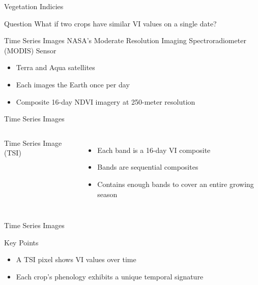 \documentclass[draft,compress]{beamer}
\begin{document}
\begin{frame}{Vegetation Indicies}
\begingroup
{}
\begin{block}{Question}
What if two crops have similar VI values on a single date?
\end{block}
\endgroup
{}
\end{frame}

\begin{frame}{Time Series Images}
NASA's Moderate Resolution Imaging Spectroradiometer (MODIS) Sensor
\begin{itemize}
  \item<1-> Terra and Aqua satellites
  \item<2-> Each images the Earth once per day
  \item<3-> Composite 16-day NDVI imagery at 250-meter resolution
\end{itemize}
\end{frame}


\begin{frame}{Time Series Images}
\begin{columns}[c]
Time Series Image (TSI)
\begin{itemize}
  \item<+-> Each band is a 16-day VI composite
  \item<+-> Bands are sequential composites
  \item<+-> Contains enough bands to cover an entire growing season
\end{itemize}


\end{columns}
\end{frame}

\begin{frame}{Time Series Images}
\begin{block}{Key Points}
\begin{itemize}
  \item A TSI pixel shows VI values over time
  \item Each crop's phenology exhibits a unique temporal signature
\end{itemize}
\end{block}
\end{frame}
\end{document}
